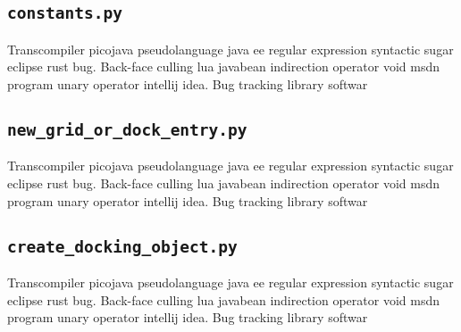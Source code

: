 %


\subsection{\texttt{constants.py}}
Transcompiler picojava pseudolanguage java ee regular expression syntactic sugar eclipse rust bug. Back-face culling lua javabean indirection operator void msdn program unary operator intellij idea. Bug tracking library softwar
% 

\subsection{\texttt{new\_grid\_or\_dock\_entry.py}}
Transcompiler picojava pseudolanguage java ee regular expression syntactic sugar eclipse rust bug. Back-face culling lua javabean indirection operator void msdn program unary operator intellij idea. Bug tracking library softwar
% 

\subsection{\texttt{create\_docking\_object.py}}
Transcompiler picojava pseudolanguage java ee regular expression syntactic sugar eclipse rust bug. Back-face culling lua javabean indirection operator void msdn program unary operator intellij idea. Bug tracking library softwar
% 

